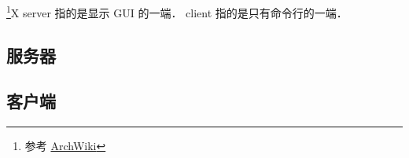 
\begin{issues}
\issueDraft
\end{issues}

\footnote{参考 \href{https://wiki.archlinux.org/title/xorg}{ArchWiki}}X server 指的是显示 GUI 的一端． client 指的是只有命令行的一端．

\subsection{服务器}

\subsection{客户端}
